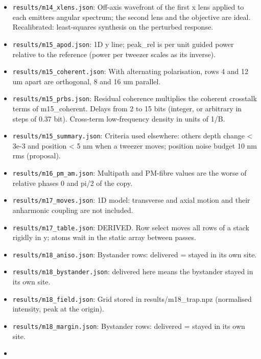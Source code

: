 \begin{itemize}
  unit guided power relative to the ideal sine-condition lens in air,
  beta 0.7 (power per tweezer scales as its inverse).
\item
  \texttt{results/m14\_xlens.json}: Off-axis wavefront of the first x
  lens applied to each emitter\textquotesingle s angular spectrum; the
  second lens and the objective are ideal. Recalibrated: least-squares
  synthesis on the perturbed response.
\item
  \texttt{results/m15\_apod.json}: 1D y line; peak\_rel is per unit
  guided power relative to the reference (power per tweezer scales as
  its inverse).
\item
  \texttt{results/m15\_coherent.json}: With alternating polarisation,
  rows 4 and 12 um apart are orthogonal, 8 and 16 um parallel.
\item
  \texttt{results/m15\_prbs.json}: Residual coherence multiplies the
  coherent crosstalk terms of m15\_coherent. Delays from 2 to 15 bits
  (integer, or arbitrary in steps of 0.37 bit). Cross-term low-frequency
  density in units of 1/B.
\item
  \texttt{results/m15\_summary.json}: Criteria used elsewhere:
  others\textquotesingle{} depth change \textless{} 3e-3 and position
  \textless{} 5 nm when a tweezer moves; position noise budget 10 nm rms
  (proposal).
\item
  \texttt{results/m16\_pm\_am.json}: Multipath and PM-fibre values are
  the worse of relative phases 0 and pi/2 of the copy.
\item
  \texttt{results/m17\_moves.json}: 1D model: transverse and axial
  motion and their anharmonic coupling are not included.
\item
  \texttt{results/m17\_table.json}: DERIVED. Row select moves all rows
  of a stack rigidly in y; atoms wait in the static array between
  passes.
\item
  \texttt{results/m18\_aniso.json}: Bystander rows:
  \textquotesingle delivered\textquotesingle{} = stayed in its own site.
\item
  \texttt{results/m18\_bystander.json}:
  \textquotesingle delivered\textquotesingle{} here means the bystander
  stayed in its own site.
\item
  \texttt{results/m18\_field.json}: Grid stored in results/m18\_trap.npz
  (normalised intensity, peak at the origin).
\item
  \texttt{results/m18\_margin.json}: Bystander rows:
  \textquotesingle delivered\textquotesingle{} = stayed in its own site.
\item

\end{itemize}
